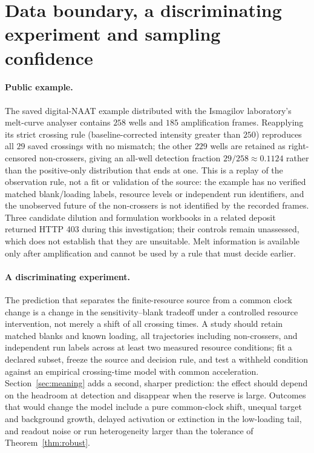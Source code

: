 \documentclass[11pt,a4paper]{article}
\theoremstyle{plain}
\theoremstyle{definition}
\theoremstyle{remark}
\begin{document}
\section{Data boundary, a discriminating experiment and sampling confidence}\label{sec:data}

\paragraph{Public example.} The saved digital-NAAT example distributed with the Ismagilov laboratory's melt-curve analyser \citep{ismagilovcode} contains $258$ wells and $185$ amplification frames. Reapplying its strict crossing rule (baseline-corrected intensity greater than $250$) reproduces all $29$ saved crossings with no mismatch; the other $229$ wells are retained as right-censored non-crossers, giving an all-well detection fraction $29/258\approx0.1124$ rather than the positive-only distribution that ends at one. This is a replay of the observation rule, not a fit or validation of the source: the example has no verified matched blank/loading labels, resource levels or independent run identifiers, and the unobserved future of the non-crossers is not identified by the recorded frames. Three candidate dilution and formulation workbooks in a related deposit \citep{jue2019data} returned HTTP 403 during this investigation; their controls remain unassessed, which does not establish that they are unsuitable. Melt information is available only after amplification and cannot be used by a rule that must decide earlier.

\paragraph{A discriminating experiment.} The prediction that separates the finite-resource source from a common clock change is a change in the sensitivity--blank tradeoff under a controlled resource intervention, not merely a shift of all crossing times. A study should retain matched blanks and known loading, all trajectories including non-crossers, and independent run labels across at least two measured resource conditions; fit a declared subset, freeze the source and decision rule, and test a withheld condition against an empirical crossing-time model with common acceleration. Section~\ref{sec:meaning} adds a second, sharper prediction: the effect should depend on the headroom at detection and disappear when the reserve is large. Outcomes that would change the model include a pure common-clock shift, unequal target and background growth, delayed activation or extinction in the low-loading tail, and readout noise or run heterogeneity larger than the tolerance of Theorem~\ref{thm:robust}.
\end{document}
